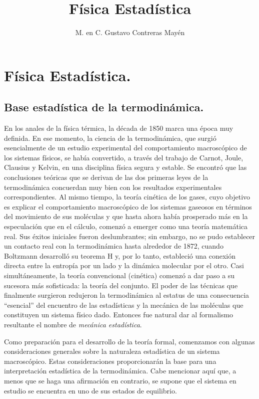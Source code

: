 
\usepackage{chemformula}
\title{Física Estadística\vspace{-3ex}}
\author{M. en C. Gustavo Contreras Mayén}
\date{ }



\vspace{-4cm}
\maketitle
\fontsize{14}{14}\selectfont
\tableofcontents
\newpage

\section{Física Estadística.}
\subsection{Base estadística de la termodinámica.}


En los anales de la física térmica, la década de 1850 marca una época muy definida. En ese momento, la ciencia de la termodinámica, que surgió esencialmente de un estudio experimental del comportamiento macroscópico de los sistemas físicos, se había convertido, a través del trabajo de Carnot, Joule, Clausius y Kelvin, en una disciplina física segura y estable. Se encontró que las conclusiones teóricas que se derivan de las dos primeras leyes de la termodinámica concuerdan muy bien con los resultados experimentales correspondientes. Al mismo tiempo, la teoría cinética de los gases, cuyo objetivo es explicar el comportamiento macroscópico de los sistemas gaseosos en términos del movimiento de sus moléculas y que hasta ahora había prosperado más en la especulación que en el cálculo, comenzó a emerger como una teoría matemática real. Sus éxitos iniciales fueron deslumbrantes; sin embargo, no se pudo establecer un contacto real con la termodinámica hasta alrededor de 1872, cuando Boltzmann desarrolló su teorema H y, por lo tanto, estableció una conexión directa entre la entropía por un lado y la dinámica molecular por el otro. Casi simultáneamente, la teoría convencional (cinética) comenzó a dar paso a su sucesora más sofisticada: la teoría del conjunto. El poder de las técnicas que finalmente surgieron redujeron la termodinámica al estatus de una consecuencia \enquote{esencial} del encuentro de las estadísticas y la mecánica de las moléculas que constituyen un sistema físico dado. Entonces fue natural dar al formalismo resultante el nombre de \emph{mecánica estadística}.
\par
Como preparación para el desarrollo de la teoría formal, comenzamos con algunas consideraciones generales sobre la naturaleza estadística de un sistema macroscópico. Estas consideraciones proporcionarán la base para una interpretación estadística de la termodinámica. Cabe mencionar aquí que, a menos que se haga una afirmación en contrario, se supone que el sistema en estudio se encuentra en uno de sus estados de equilibrio.

